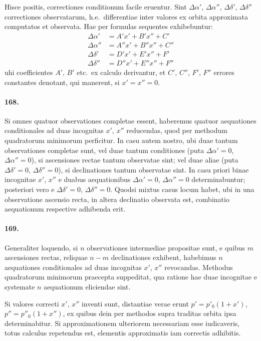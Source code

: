 \documentclass[12pt,a4paper]{article}
\begin{document}
Hisce positis, correctiones conditionum facile eruentur. Sint $\Delta\alpha'$, $\Delta\alpha''$, $\Delta\delta'$, $\Delta\delta''$ correctiones observatarum, h.e.~differentiae inter valores ex orbita approximata computatos et observata. Hae per formulas sequentes exhibebuntur:
\begin{align*}
\Delta\alpha' &= A'x' + B'x'' + C'\\
\Delta\alpha'' &= A''x' + B''x'' + C''\\
\Delta\delta' &= D'x' + E'x'' + F'\\
\Delta\delta'' &= D''x' + E''x'' + F''
\end{align*}
uhi coefficientes $A'$, $B'$ etc.~ex calculo derivantur, et $C'$, $C''$, $F'$, $F''$ errores constantes denotant, qui manerent, si $x' = x'' = 0$.

\paragraph{168.}
Si omnes quatuor observationes completae essent, haberemus quatuor aequationes conditionales ad duas incognitas $x'$, $x''$ reducendas, quod per methodum quadratorum minimorum perficitur. In casu autem nostro, ubi duae tantum observationes completae sunt, vel duae tantum conditiones (puta $\Delta\alpha' = 0$, $\Delta\alpha'' = 0$), si ascensiones rectae tantum observatae sint; vel duae aliae (puta $\Delta\delta' = 0$, $\Delta\delta'' = 0$), si declinationes tantum observatae sint. In casu priori binae incognitae $x'$, $x''$ e duabus aequationibus $\Delta\alpha' = 0$, $\Delta\alpha'' = 0$ determinabuntur; posteriori vero e $\Delta\delta' = 0$, $\Delta\delta'' = 0$. Quodsi mixtus casus locum habet, ubi in una observatione ascensio recta, in altera declinatio observata est, combinatio aequationum respective adhibenda erit.

\paragraph{169.}
Generaliter loquendo, si $n$ observationes intermediae propositae sunt, e quibus $m$ ascensiones rectas, reliquae $n-m$ declinationes exhibent, habebimus $n$ aequationes conditionales ad duas incognitas $x'$, $x''$ revocandas. Methodus quadratorum minimorum praecepta suppeditat, qua ratione hae duae incognitae e systemate $n$ aequationum eliciendae sint.

Si valores correcti $x'$, $x''$ inventi sunt, distantiae verae erunt $p' = p'_0(1 + x')$, $p'' = p''_0(1 + x'')$, ex quibus dein per methodos supra traditas orbita ipsa determinabitur. Si approximationem ulteriorem necessariam esse iudicaveris, totus calculus repetendus est, elementis approximatis iam correctis adhibitis.
\end{document}
